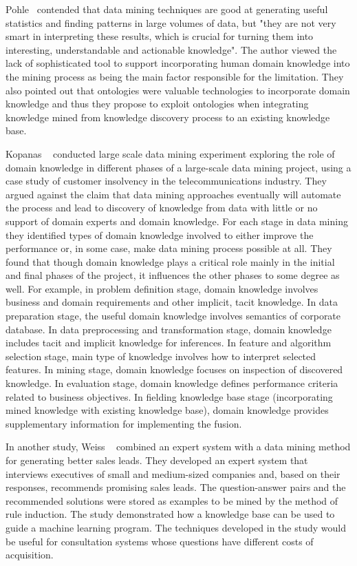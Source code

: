 Pohle~\cite{Pohle03} contended that data mining techniques are good at generating useful statistics and finding patterns in large volumes of data, but "they are not very smart in interpreting these results, which is crucial for turning them into interesting, understandable and actionable knowledge". The author viewed the lack of sophisticated tool to support incorporating human domain knowledge into the mining process as being the main factor responsible for the limitation. They also pointed out that ontologies were valuable technologies to incorporate domain knowledge and thus they propose to exploit ontologies when integrating knowledge mined from knowledge discovery process to an existing knowledge base.

Kopanas \etal~\cite{Kopanas02} conducted large scale data mining experiment exploring the role of domain knowledge in different phases of a large-scale data mining project, using a case study of customer insolvency in the telecommunications industry. They argued against the claim that data mining approaches eventually will automate the process and lead to discovery of knowledge from data with little or no support of domain experts and domain knowledge. For each stage in data mining they identified types of domain knowledge involved to either improve the performance or, in some case, make data mining process possible at all. They found that though domain knowledge plays a critical role mainly in the initial and final phases of the project, it influences the other phases to some degree as well. For example, in problem definition stage, domain knowledge involves business and domain requirements and other implicit, tacit knowledge. In data preparation stage, the useful domain knowledge involves semantics of corporate database. In data preprocessing and transformation stage, domain knowledge includes tacit and implicit knowledge for inferences. In feature and algorithm selection stage, main type of knowledge involves how to interpret selected features. In mining stage, domain knowledge focuses on inspection of discovered knowledge. In evaluation stage, domain knowledge defines performance criteria related to business objectives. In fielding knowledge base stage (incorporating mined knowledge with existing knowledge base), domain knowledge provides supplementary information for implementing the fusion.

In another study, Weiss \etal~\cite{Weiss01} combined an expert system with a data mining method for generating better sales leads. They developed an expert system that interviews executives of small and medium-sized companies and, based on their responses, recommends promising sales leads. The question-answer pairs and the recommended solutions were stored as examples to be mined by the method of rule induction. The study demonstrated how a knowledge base can be used to guide a machine learning program. The techniques developed in the study would be useful for consultation systems whose questions have different costs of acquisition.

